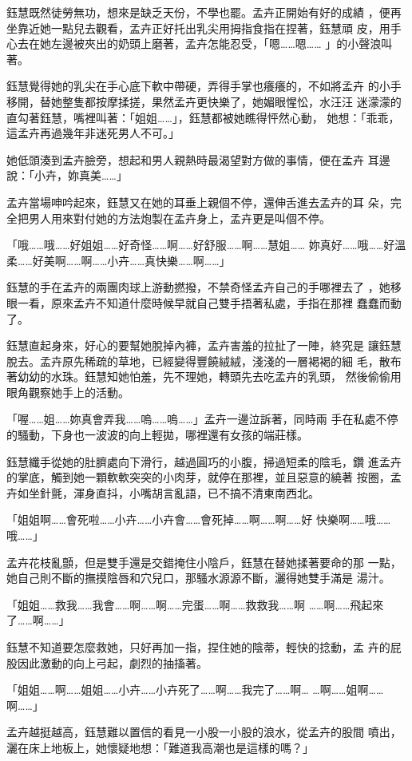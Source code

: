 鈺慧既然徒勞無功，想來是缺乏天份，不學也罷。孟卉正開始有好的成績
，便再坐靠近她一點兒去觀看，孟卉正好托出乳尖用拇指食指在捏著，鈺慧頑
皮，用手心去在她左邊被夾出的奶頭上磨著，孟卉怎能忍受，「嗯……嗯……
」的小聲浪叫著。

鈺慧覺得她的乳尖在手心底下軟中帶硬，弄得手掌也癢癢的，不如將孟卉
的小手移開，替她整隻都按摩揉搓，果然孟卉更快樂了，她媚眼惺忪，水汪汪
迷濛濛的直勾著鈺慧，嘴裡叫著：「姐姐……」，鈺慧都被她瞧得怦然心動，
她想：「乖乖，這孟卉再過幾年非迷死男人不可。」

她低頭湊到孟卉臉旁，想起和男人親熱時最渴望對方做的事情，便在孟卉
耳邊說：「小卉，妳真美……」

孟卉當場呻吟起來，鈺慧又在她的耳垂上親個不停，還伸舌進去孟卉的耳
朵，完全把男人用來對付她的方法炮製在孟卉身上，孟卉更是叫個不停。

「哦……哦……好姐姐……好奇怪……啊……好舒服……啊……慧姐……
妳真好……哦……好溫柔……好美啊……啊……小卉……真快樂……啊……」

鈺慧的手在孟卉的兩團肉球上游動撚撥，不禁奇怪孟卉自己的手哪裡去了
，她移眼一看，原來孟卉不知道什麼時候早就自己雙手捂著私處，手指在那裡
蠢蠢而動了。

鈺慧直起身來，好心的要幫她脫掉內褲，孟卉害羞的拉扯了一陣，終究是
讓鈺慧脫去。孟卉原先稀疏的草地，已經變得豐饒絨絨，淺淺的一層褐褐的細
毛，散布著幼幼的水珠。鈺慧知她怕羞，先不理她，轉頭先去吃孟卉的乳頭，
然後偷偷用眼角觀察她手上的活動。

「喔……姐……妳真會弄我……嗚……嗚……」孟卉一邊泣訴著，同時兩
手在私處不停的騷動，下身也一波波的向上輕拋，哪裡還有女孩的端莊樣。

鈺慧纖手從她的肚臍處向下滑行，越過圓巧的小腹，掃過短柔的陰毛，鑽
進孟卉的掌底，觸到她一顆軟軟突突的小肉芽，就停在那裡，並且惡意的繞著
按圈，孟卉如坐針氈，渾身直抖，小嘴胡言亂語，已不搞不清東南西北。

「姐姐啊……會死啦……小卉……小卉會……會死掉……啊……啊……好
快樂啊……哦……哦……」

孟卉花枝亂顫，但是雙手還是交錯掩住小陰戶，鈺慧在替她揉著要命的那
一點，她自己則不斷的撫摸陰唇和穴兒口，那騷水源源不斷，灑得她雙手滿是
湯汁。

「姐姐……救我……我會……啊……啊……完蛋……啊……救救我……啊
……啊……飛起來了……啊……」

鈺慧不知道要怎麼救她，只好再加一指，捏住她的陰蒂，輕快的捻動，孟
卉的屁股因此激動的向上弓起，劇烈的抽搐著。

「姐姐……啊……姐姐……小卉……小卉死了……啊……我完了……啊…
…啊……姐啊……啊……」

孟卉越挺越高，鈺慧難以置信的看見一小股一小股的浪水，從孟卉的股間
噴出，灑在床上地板上，她懷疑地想：「難道我高潮也是這樣的嗎？」

